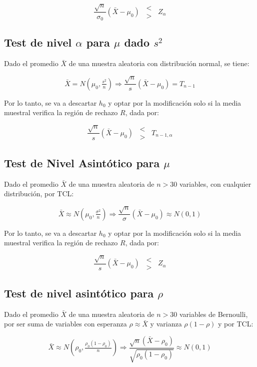 \documentclass[a5paper,12pt,twoside]{book}
\begin{document}
$$ \dfrac{\sqrt{n}}{\sigma_0} (\bar{X}-\mu_0) \enspace \substack{< \\ >} \enspace Z_\alpha $$

\subsection{Test de nivel $\alpha$ para $\mu$ dado $s^2$}

Dado el promedio $\bar{X}$ de una muestra aleatoria con distribución normal, se tiene:

$$ \bar{X} = N(\mu_0,\tfrac{s^2}{n}) \Rightarrow \dfrac{\sqrt{n}}{s} (\bar{X}-\mu_0) = T_{n-1} $$

Por lo tanto, se va a descartar $h_0$ y optar por la modificación solo si la media muestral verifica la región de rechazo $R$, dada por:

$$ \dfrac{\sqrt{n}}{s} (\bar{X}-\mu_0) \enspace \substack{< \\ >} \enspace T_{n-1,\alpha} $$

\subsection{Test de Nivel Asintótico para $\mu$}

Dado el promedio $\bar{X}$ de una muestra aleatoria de $n>30$ variables, con cualquier distribución, por TCL:

$$ \bar{X} \approx N(\mu_0,\tfrac{\sigma^2}{n}) \Rightarrow \dfrac{\sqrt{n}}{\sigma} (\bar{X}-\mu_0) \approx N(0,1) $$

Por lo tanto, se va a descartar $h_0$ y optar por la modificación solo si la media muestral verifica la región de rechazo $R$, dada por:

$$ \dfrac{\sqrt{n}}{s} (\bar{X}-\mu_0) \enspace \substack{< \\ >} \enspace Z_\alpha $$

\subsection{Test de nivel asintótico para $\rho$}

Dado el promedio $\bar{X}$ de una muestra aleatoria de $n>30$ variables de Bernoulli, por ser suma de variables con esperanza $\rho \approx \bar{X}$ y varianza $\rho(1-\rho)$ y por TCL:

$$ \bar{X} \approx N(\rho_0,\tfrac{\rho_0(1-\rho_0)}{n}) \Rightarrow \dfrac{\sqrt{n}(\bar{X}-\rho_0)}{\sqrt{\rho_0(1-\rho_0)}} \approx N(0,1) $$
\end{document}

